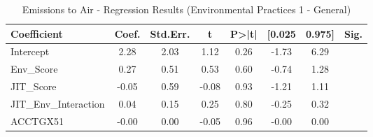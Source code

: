 \begin{table}[htbp]
    \centering
    \caption{Emissions to Air - Regression Results (Environmental Practices 1 - General)}
    \label{tab:regression}
    \begin{tabular}{lccccccc}
\toprule
Coefficient & Coef. & Std.Err. & t & P>|t| & [0.025 & 0.975] & Sig. \\
\midrule
Intercept & 2.28 & 2.03 & 1.12 & 0.26 & -1.73 & 6.29 &  \\
Env\_Score & 0.27 & 0.51 & 0.53 & 0.60 & -0.74 & 1.28 &  \\
JIT\_Score & -0.05 & 0.59 & -0.08 & 0.93 & -1.21 & 1.11 &  \\
JIT\_Env\_Interaction & 0.04 & 0.15 & 0.25 & 0.80 & -0.25 & 0.32 &  \\
ACCTGX51 & -0.00 & 0.00 & -0.05 & 0.96 & -0.00 & 0.00 &  \\
\bottomrule
\end{tabular}

    \end{table}
    